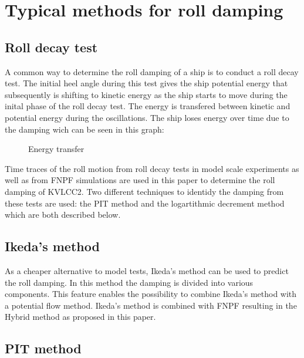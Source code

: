 \section{Typical methods for roll
damping}\label{typical-methods-for-roll-damping}

    \subsection{Roll decay test}\label{roll-decay-test}

A common way to determine the roll damping of a ship is to conduct a
roll decay test. The initial heel angle during this test gives the ship
potential energy that subsequently is shifting to kinetic energy as the
ship starts to move during the inital phase of the roll decay test. The
energy is transfered between kinetic and potential energy during the
oscillations. The ship loses energy over time due to the damping wich
can be seen in this graph:
 
            
    
    \begin{figure}
        \begin{center}\end{center}
        \caption{Energy transfer}
        \label{fig:energy}
    \end{figure}
    

    Time traces of the roll motion from roll decay tests in model scale
experiments as well as from FNPF simulations are used in this paper to
determine the roll damping of KVLCC2. Two different techniques to
identidy the damping from these tests are used: the PIT method and the
logartithmic decrement method which are both described below.

\subsection{Ikeda's method}\label{ikedas-method}

As a cheaper alternative to model tests, Ikeda's method can be used to
predict the roll damping. In this method the damping is divided into
various components. This feature enables the possibility to combine
Ikeda's method with a potential flow method. Ikeda's method is combined
with FNPF resulting in the Hybrid method as proposed in this paper.

    \subsection{PIT method}\label{pit-method}

